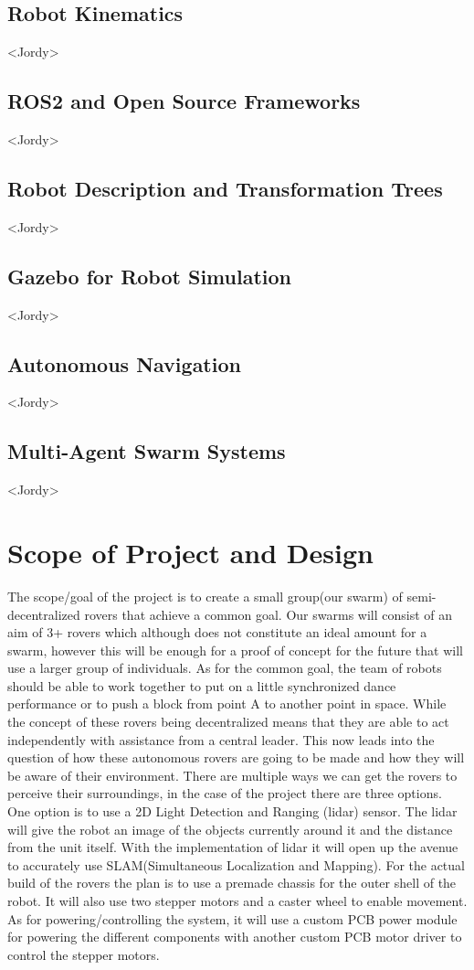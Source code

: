 \documentclass[conference]{IEEEtran}
\begin{document}
\subsection{Robot Kinematics} <Jordy>

\subsection{ROS2 and Open Source Frameworks} <Jordy>

\subsection{Robot Description and Transformation Trees} <Jordy>

\subsection{Gazebo for Robot Simulation} <Jordy>

\subsection{Autonomous Navigation} <Jordy>

\subsection{Multi-Agent Swarm Systems} <Jordy>

\section{Scope of Project and Design}The scope/goal of the project is to create a small group(our swarm) of semi-decentralized rovers that achieve a common goal. Our swarms will consist of an aim of 3+ rovers which although does not constitute an ideal amount for a swarm, however this will be enough for a proof of concept for the future that will use a larger group of individuals. As for the common goal, the team of robots should be able to work together to put on a little synchronized dance performance or to push a block from point A to another point in space. While the concept of these rovers being decentralized means that they are able to act independently with assistance from a central leader. This now leads into the question of how these autonomous rovers are going to be made and how they will be aware of their environment.
There are multiple ways we can get the rovers to perceive their surroundings, in the case of the project there are three options. One option is to use a 2D Light Detection and Ranging (lidar) sensor. The lidar will give the robot an image of the objects currently around it and the distance from the unit itself. With the implementation of lidar it will open up the avenue to accurately use SLAM(Simultaneous Localization and Mapping). For the actual build of the rovers the plan is to use a premade chassis for the outer shell of the robot. It will also use two stepper motors and a caster wheel to enable movement. As for powering/controlling the system, it will use a custom PCB power module for powering the different components with another custom PCB motor driver to control the stepper motors.
\end{document}
